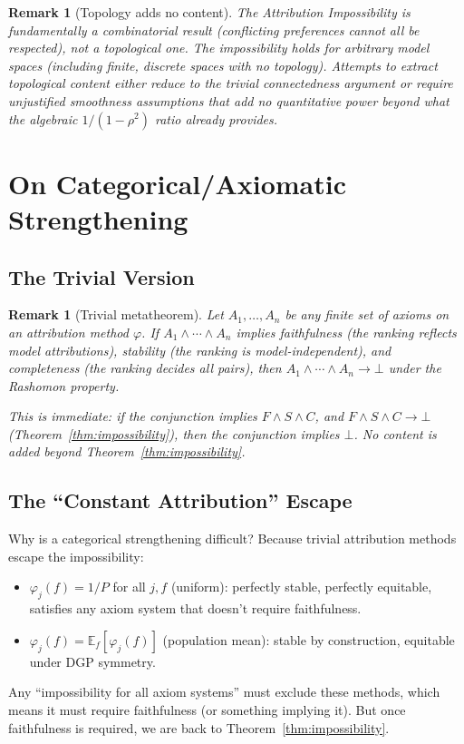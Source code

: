 \documentclass{article}
\newtheorem{remark}[theorem]{Remark}
\newcommand{\E}{\mathbb{E}}
\begin{document}
\begin{remark}[Topology adds no content]
\label{rem:topology-trivial}
The Attribution Impossibility is fundamentally a \emph{combinatorial}
result (conflicting preferences cannot all be respected), not a
\emph{topological} one. The impossibility holds for arbitrary model
spaces (including finite, discrete spaces with no topology). Attempts
to extract topological content either reduce to the trivial
connectedness argument or require unjustified smoothness assumptions
that add no quantitative power beyond what the algebraic
$1/(1-\rho^2)$ ratio already provides.
\end{remark}

\section{On Categorical/Axiomatic Strengthening}

\subsection{The Trivial Version}

\begin{remark}[Trivial metatheorem]
Let $A_1, \ldots, A_n$ be any finite set of axioms on an
attribution method $\varphi$. If $A_1 \wedge \cdots \wedge A_n$
implies faithfulness (the ranking reflects model attributions),
stability (the ranking is model-independent), and completeness
(the ranking decides all pairs), then
$A_1 \wedge \cdots \wedge A_n \to \bot$ under the Rashomon property.

This is immediate: if the conjunction implies $F \wedge S \wedge C$,
and $F \wedge S \wedge C \to \bot$ (Theorem~\ref{thm:impossibility}), then the conjunction
implies $\bot$. No content is added beyond Theorem~\ref{thm:impossibility}.
\end{remark}

\subsection{The ``Constant Attribution'' Escape}

Why is a categorical strengthening difficult? Because trivial attribution methods escape the impossibility:
\begin{itemize}
    \item $\varphi_j(f) = 1/P$ for all $j, f$ (uniform): perfectly stable, perfectly equitable, satisfies any axiom system that doesn't require faithfulness.
    \item $\varphi_j(f) = \E_f[\varphi_j(f)]$ (population mean): stable by construction, equitable under DGP symmetry.
\end{itemize}
Any ``impossibility for all axiom systems'' must exclude these methods, which means it must require faithfulness (or something implying it). But once faithfulness is required, we are back to Theorem~\ref{thm:impossibility}.
\end{document}
